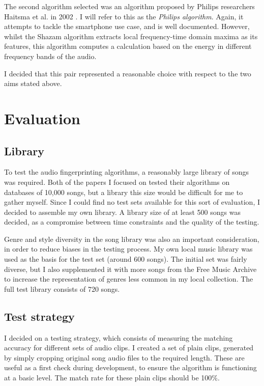\documentclass[12pt,a4paper,twoside,openright]{report}
\begin{document}
The second algorithm selected was an algorithm proposed by Philips researchers Haitsma et al. in 2002 \cite{Haitsma02}. I will refer to this as the \textit{Philips algorithm}. Again, it attempts to tackle the smartphone use case, and is well documented. However, whilst the Shazam algorithm extracts local frequency-time domain maxima as its features, this algorithm computes a calculation based on the energy in different frequency bands of the audio. 

I decided that this pair represented a reasonable choice with respect to the two aims stated above.


\section{Evaluation}

\subsection{Library}

To test the audio fingerprinting algorithms, a reasonably large library of songs was required. Both of the papers I focused on tested their algorithms on databases of 10,000 songs, but a library this size would be difficult for me to gather myself. Since I could find no test sets available for this sort of evaluation, I decided to assemble my own library. A library size of at least 500 songs was decided, as a compromise between time constraints and the quality of the testing.

Genre and style diversity in the song library was also an important consideration, in order to reduce biases in the testing process. My own local music library was used as the basis for the test set (around 600 songs). The initial set was fairly diverse, but I also supplemented it with more songs from the Free Music Archive to increase the representation of genres less common in my local collection. The full test library consists of 720 songs.

\subsection{Test strategy}

I decided on a testing strategy, which consists of measuring the matching accuracy for different sets of audio clips. I created a set of plain clips, generated by simply cropping original song audio files to the required length. These are useful as a first check during development, to ensure the algorithm is functioning at a basic level. The match rate for these plain clips should be 100\%.
\end{document}
